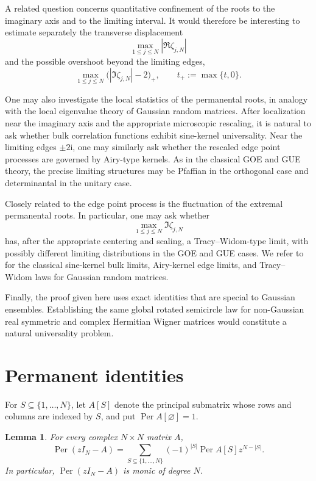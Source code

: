 \documentclass[11pt,reqno]{amsart}
\numberwithin{equation}{section}
\newtheorem{lemma}[theorem]{Lemma}
\theoremstyle{definition}
\theoremstyle{remark}
\DeclareMathOperator{\Per}{Per}
\newcommand{\1}{\mathbf 1}
\newcommand{\ii}{\mathrm i}
\begin{document}
A related question concerns quantitative confinement of the roots to the
imaginary axis and to the limiting interval.  
It would therefore be interesting to estimate separately the transverse
displacement
\[
  \max_{1\le j\le N}|\Re\zeta_{j,N}|
\]
and the possible overshoot beyond the limiting edges,
\[
  \max_{1\le j\le N}
  \bigl(|\Im\zeta_{j,N}|-2\bigr)_+,
  \qquad t_+:=\max\{t,0\}.
\]

One may also investigate the local statistics of the permanental roots, in
analogy with the local eigenvalue theory of Gaussian random matrices.  After
localization near the imaginary axis and the appropriate microscopic
rescaling, it is natural to ask whether bulk correlation functions exhibit
sine-kernel universality.  Near the limiting edges \(\pm2\ii\), one may
similarly ask whether the rescaled edge point processes are governed by
Airy-type kernels.  As in the classical GOE and GUE theory, the precise
limiting structures may be Pfaffian in the orthogonal case and determinantal
in the unitary case.

Closely related to the edge point process is the fluctuation of the extremal
permanental roots.  In particular, one may ask whether
\[
  \max_{1\le j\le N}\Im\zeta_{j,N}
\]
has, after the appropriate centering and scaling, a Tracy--Widom-type limit,
with possibly different limiting distributions in the GOE and GUE cases.  We
refer to \cite{AndersonGuionnetZeitouni2010} for the classical sine-kernel
bulk limits, Airy-kernel edge limits, and Tracy--Widom laws for Gaussian
random matrices.

Finally, the proof given here uses exact identities that are special to
Gaussian ensembles.  Establishing the same global rotated semicircle law for
non-Gaussian real symmetric and complex Hermitian Wigner matrices would
constitute a natural universality problem.

\section{Permanent identities}

For \(S\subseteq\{1,\dots,N\}\), let \(A[S]\) denote the principal submatrix
whose rows and columns are indexed by \(S\), and put \(\Per A[\varnothing]=1\).

\begin{lemma}
For every complex \(N\times N\) matrix \(A\),
\begin{equation}\label{eq:principal-expansion}
  \Per(zI_N-A)
  =
  \sum_{S\subseteq\{1,\dots,N\}}
  (-1)^{|S|}\Per A[S]z^{N-|S|}.
\end{equation}
In particular, \(\Per(zI_N-A)\) is monic of degree \(N\).
\end{lemma}
\end{document}
